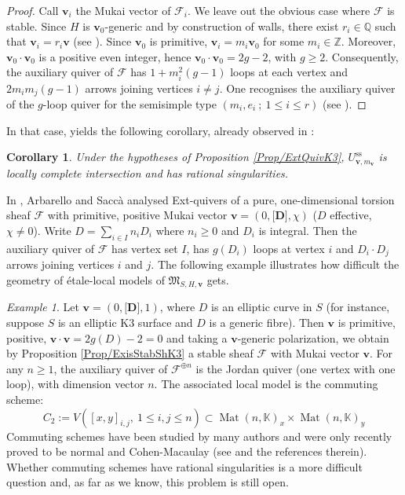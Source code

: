 \documentclass[11pt,english]{article}
\numberwithin{equation}{section}
\numberwithin{figure}{section}
\theoremstyle{definition}
\theoremstyle{plain}
\newtheorem{cor}[df]{Corollary}
\theoremstyle{remark}
\newtheorem{exmp}[df]{Example}
\DeclareMathOperator{\Mat}{Mat}
\newcommand\KK{\mathbb{K}}
\begin{document}
\begin{proof}

Call $\mathbf{v}_{i}$ the Mukai vector of $\mathcal{F}_{i}$. We
leave out the obvious case where $\mathcal{F}$ is stable. Since $H$
is $\textbf{v}_{0}$-generic and by construction of walls, there exist
$r_{i}\in\mathbb{Q}$ such that $\mathbf{v}_{i}=r_{i}\mathbf{v}$
(see \cite[\S2.4.]{KLS06}). Since $\mathbf{v}_{0}$ is primitive,
$\mathbf{v}_{i}=m_{i}\mathbf{v}_{0}$ for some $m_{i}\in\mathbb{Z}$.
Moreover, $\mathbf{v}_{0}\cdot\mathbf{v}_{0}$ is a positive even
integer, hence $\mathbf{v}_{0}\cdot\mathbf{v}_{0}=2g-2$, with $g\geq2$.
Consequently, the auxiliary quiver of $\mathcal{F}$ has $1+m_{i}^{2}(g-1)$
loops at each vertex and $2m_{i}m_{j}(g-1)$ arrows joining vertices
$i\ne j$. One recognises the auxiliary quiver of the $g$-loop quiver
for the semisimple type $(m_{i},e_{i}\ ;\ 1\leq i\leq r)$ (see \cite[Prop. 2.26.]{Bud21}).
\end{proof}

In that case, \cite[Thm. 1.1.]{Bud21} yields the following corollary,
already observed in \cite{BZ19}:

\begin{cor}

Under the hypotheses of Proposition \ref{Prop/ExtQuivK3}, $U_{\textbf{v},m_{\textbf{v}}}^{\mathrm{ss}}$
is locally complete intersection and has rational singularities.

\end{cor}

In \cite[\S6.]{AS18}, Arbarello and Saccà analysed Ext-quivers of
a pure, one-dimensional torsion sheaf $\mathcal{F}$ with primitive,
positive Mukai vector $\textbf{v}=(0,\textbf{[D]},\chi)$ ($D$ effective,
$\chi\ne0$). Write $D=\sum_{i\in I}n_{i}D_{i}$ where $n_{i}\geq0$
and $D_{i}$ is integral. Then the auxiliary quiver of $\mathcal{F}$
has vertex set $I$, has $g(D_{i})$ loops at vertex $i$ and $D_{i}\cdot D_{j}$
arrows joining vertices $i$ and $j$. The following example illustrates
how difficult the geometry of étale-local models of $\mathfrak{M}_{S,H,\textbf{v}}$
gets.

\begin{exmp}

Let $\textbf{v}=(0,\textbf{[D]},1)$, where $D$ is an elliptic curve
in $S$ (for instance, suppose $S$ is an elliptic K3 surface and
$D$ is a generic fibre). Then $\textbf{v}$ is primitive, positive,
$\textbf{v}\cdot\textbf{v}=2g(D)-2=0$ and taking a $\textbf{v}$-generic
polarization, we obtain by Proposition \ref{Prop/ExisStabShK3} a
stable sheaf $\mathcal{F}$ with Mukai vector $\textbf{v}$. For any
$n\geq1$, the auxiliary quiver of $\mathcal{F}^{\oplus n}$ is the
Jordan quiver (one vertex with one loop), with dimension vector $n$.
The associated local model is the commuting scheme:\[
C_2:=V([x,y]_{i,j},\ 1\leq i,j\leq n)\subset\Mat(n,\KK)_x\times\Mat(n,\KK)_y
\]Commuting schemes have been studied by many authors and were only
recently proved to be normal and Cohen-Macaulay (see \cite{Cha20}
and the references therein). Whether commuting schemes have rational
singularities is a more difficult question and, as far as we know,
this problem is still open.

\end{exmp}
\end{document}
